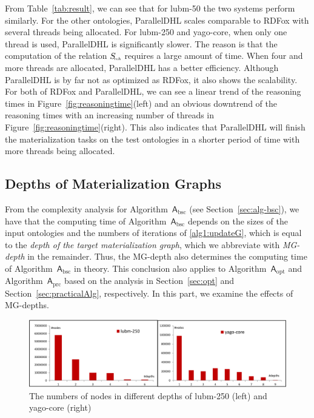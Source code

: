 From Table~\ref{tab:result}, we can see that for lubm-50 the two systems perform similarly.
For the other ontologies, ParallelDHL scales comparable to RDFox with several threads being allocated.
For lubm-250 and yago-core, when only one thread is used, ParallelDHL
is significantly slower.
The reason is that the computation of the relation $S_{\textit{\!\tiny rch}}$ requires a large amount of time. When
four and more threads are allocated, ParallelDHL has a better efficiency.
Although ParallelDHL is by far not as optimized as RDFox, it also shows the scalability.
For both of RDFox and ParallelDHL,
we can see a linear trend of the reasoning times
in Figure~\ref{fig:reasoningtime}(left) and
an obvious downtrend of the reasoning times with an increasing number of threads
in Figure~\ref{fig:reasoningtime}(right).
This also indicates that ParallelDHL will finish the materialization tasks on the test ontologies
in a shorter period of time with more threads being allocated.

\subsection{Depths of Materialization Graphs}

From the complexity analysis for Algorithm~$\mathsf{A}_{\text{bsc}}$ (see Section~\ref{sec:alg-bsc}),
we have that the computing time of
Algorithm~$\mathsf{A}_{\text{bsc}}$ depends on the sizes of the input ontologies and the
numbers of iterations of \ref{alg1:updateG},
which is equal to the \emph{depth of the target materialization
  graph}, which we abbreviate with \emph{MG-depth} in the remainder.
Thus, the MG-depth also determines the computing time of
Algorithm~$\mathsf{A}_{\text{bsc}}$ in theory.
This conclusion also applies to Algorithm~$\mathsf{A}_{\text{opt}}$ and Algorithm~$\mathsf{A}_{\text{prc}}$
based on the analysis in Section~\ref{sec:opt} and Section~\ref{sec:practicalAlg}, respectively.
In this part, we examine the effects of MG-depths.

\begin{figure}[htbp]
\begin{center}
\includegraphics[width=1\textwidth]{fig-graphdepth.eps}
\caption{The numbers of nodes in different depths of lubm-250 (left)
  and yago-core (right)}
\label{fig:graphdepth}
\end{center}
\end{figure}

